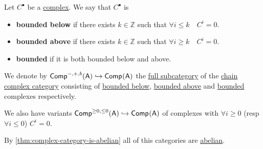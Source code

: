 \documentclass[../../../main]{subfiles}
\begin{document}
\begin{definition} \label{def:bounded-complexes}
  Let \(C^{\bullet}\) be a \hyperref[def:complex]{complex}. We say that \(C^{\bullet}\) is
  \begin{itemize}
    \item \textbf{bounded below} if there exists \(k \in \mathbb{Z}\) such that \(\forall i \leq k \quad C^{i} = 0\).
    \item \textbf{bounded above} if there exists \(k \in \mathbb{Z}\) such that \(\forall i \geq k \quad C^{i} = 0\).
    \item \textbf{bounded} if it is both bounded below and above.
  \end{itemize}
\end{definition}

\begin{notation}
  We denote by \(\Complex[-, +, b]{\category{A}} \hookrightarrow \Complex{\category{A}}\) the \hyperref[def:full-subcategory]{full subcategory} of the \hyperref[def:complex-category]{chain complex category} consisting of \hyperref[def:bounded-complexes]{bounded below}, \hyperref[def:bounded-complexes]{bounded above} and \hyperref[def:bounded-complexes]{bounded} complexes respectively.

  We also have variants \(\Complex[\geq 0, \leq 0]{\category{A}} \hookrightarrow \Complex{\category{A}}\) of complexes with \(\forall i \geq 0\) (resp \(\forall  i \leq 0\)) \(C^{i} = 0\).

  By \autoref{thm:complex-category-is-abelian} all of this categories are \hyperref[def:abelian-category]{abelian}.
\end{notation}
\end{document}
